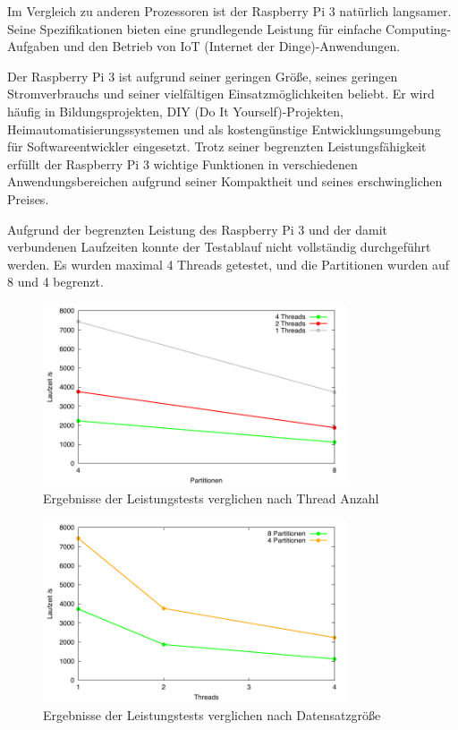 Im Vergleich zu anderen Prozessoren ist der Raspberry Pi 3 natürlich langsamer. Seine Spezifikationen bieten eine grundlegende Leistung für einfache Computing-Aufgaben und den Betrieb von IoT (Internet der Dinge)-Anwendungen.

Der Raspberry Pi 3 ist aufgrund seiner geringen Größe, seines geringen Stromverbrauchs und seiner vielfältigen Einsatzmöglichkeiten beliebt. Er wird häufig in Bildungsprojekten, DIY (Do It Yourself)-Projekten, Heimautomatisierungssystemen und als kostengünstige Entwicklungsumgebung für Softwareentwickler eingesetzt. Trotz seiner begrenzten Leistungsfähigkeit erfüllt der Raspberry Pi 3 wichtige Funktionen in verschiedenen Anwendungsbereichen aufgrund seiner Kompaktheit und seines erschwinglichen Preises.

Aufgrund der begrenzten Leistung des Raspberry Pi 3 und der damit verbundenen Laufzeiten konnte der Testablauf nicht vollständig durchgeführt werden. Es wurden maximal 4 Threads getestet, und die Partitionen wurden auf 8 und 4 begrenzt.

\begin{figure}[H]
\centering
\includegraphics[width=0.8\textwidth]{../results/plots/raspberrypi3/comp_all_threads.pdf}
\caption{Ergebnisse der Leistungstests verglichen nach Thread Anzahl}
\label{fig:raspi_benchmark_threads}
\end{figure}

\begin{figure}[htbp!]
\centering
\includegraphics[width=0.8\textwidth]{../results/plots/raspberrypi3/comp_all_partitions.pdf}
\caption{Ergebnisse der Leistungstests verglichen nach Datensatzgröße}
\label{fig:raspi_benchmark_partitions}
\end{figure}

